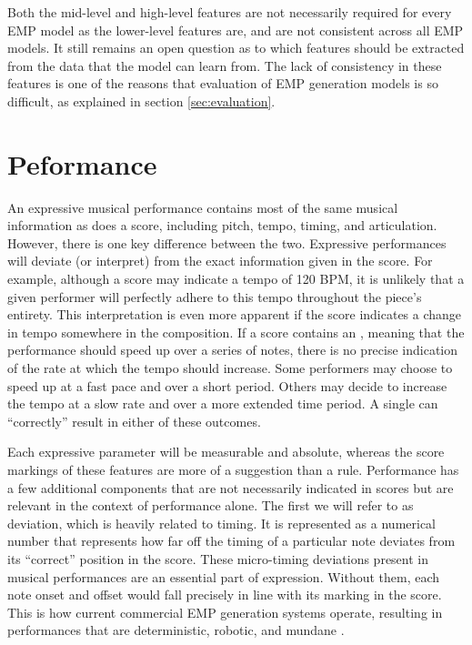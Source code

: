 Both the mid-level and high-level features are not necessarily required for every EMP model as the lower-level features are, and are not consistent across all EMP models. It still remains an open question as to which features should be extracted from the data that the model can learn from. The lack of consistency in these features is one of the reasons that evaluation of EMP generation models is so difficult, as explained in section \ref{sec:evaluation}. 


\section{Peformance}\label{sec:performance}
An expressive musical performance contains most of the same musical information as does a score, including pitch, tempo, timing, and articulation. However, there is one key difference between the two. Expressive performances will deviate (or interpret) from the exact information given in the score. For example, although a score may indicate a tempo of 120 BPM, it is unlikely that a given performer will perfectly adhere to this tempo throughout the piece's entirety. This interpretation is even more apparent if the score indicates a change in tempo somewhere in the composition. If a score contains an , meaning that the performance should speed up over a series of notes, there is no precise indication of the rate at which the tempo should increase. Some performers may choose to speed up at a fast pace and over a short period. Others may decide to increase the tempo at a slow rate and over a more extended time period. A single  can ``correctly'' result in either of these outcomes. 

Each expressive parameter will be measurable and absolute, whereas the score markings of these features are more of a suggestion than a rule. Performance has a few additional components that are not necessarily indicated in scores but are relevant in the context of performance alone. The first we will refer to as deviation, which is heavily related to timing. It is represented as a numerical number that represents how far off the timing of a particular note deviates from its ``correct'' position in the score. These micro-timing deviations present in musical performances are an essential part of expression. Without them, each note onset and offset would fall precisely in line with its marking in the score. This is how current commercial EMP generation systems operate, resulting in performances that are deterministic, robotic, and mundane . 

